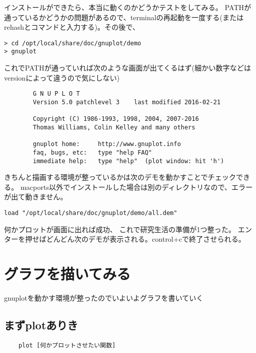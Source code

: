 \documentclass[12pt,a4paper]{jarticle}
\begin{document}
インストールができたら、本当に動くのかどうかテストをしてみる。
PATHが通っているかどうかの問題があるので、terminalの再起動を一度する(またはrehashとコマンドと入力する)。その後で、
\begin{screen}
\begin{verbatim}
> cd /opt/local/share/doc/gnuplot/demo
> gnuplot 
\end{verbatim}
\end{screen}
これでPATHが通っていれば次のような画面が出てくるはず(細かい数字などはversionによって違うので気にしない)
\begin{screen}
\begin{verbatim}
        G N U P L O T
        Version 5.0 patchlevel 3    last modified 2016-02-21

        Copyright (C) 1986-1993, 1998, 2004, 2007-2016
        Thomas Williams, Colin Kelley and many others

        gnuplot home:     http://www.gnuplot.info
        faq, bugs, etc:   type "help FAQ"
        immediate help:   type "help"  (plot window: hit 'h')
\end{verbatim}
\end{screen}
きちんと描画する環境が整っているかは次のデモを動かすことでチェックできる。
macports以外でインストールした場合は別のディレクトリなので、エラーが出て動きません。
\begin{screen}
\begin{verbatim}
load "/opt/local/share/doc/gnuplot/demo/all.dem"
\end{verbatim}
\end{screen}
何かプロットが画面に出れば成功、
これで研究生活の準備が1つ整った。
エンターを押せばどんどん次のデモが表示される。control+cで終了させられる。





\section{グラフを描いてみる}
gnuplotを動かす環境が整ったのでいよいよグラフを書いていく

\subsection{まずplotありき}
\begin{screen}
\begin{verbatim}
	plot [何かプロットさせたい関数]
\end{verbatim}
\end{screen}
\end{document}
